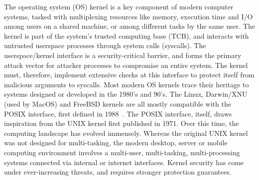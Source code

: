 The operating system (OS) kernel is a key component of modern computer systems,
tasked with multiplexing resources like memory, execution time and I/O among
users on a shared machine, or among different tasks by the same user.
The kernel is part of the system's trusted computing base (TCB), and interacts
with untrusted userspace processes through system calls (syscalls).
The userspace/kernel interface is a security-critical barrier, and forms the
primary attack vector for attacker processes to compromise an entire system.
The kernel must, therefore, implement extensive checks at this interface to
protect itself from malicious arguments to syscalls.
Most modern OS kernels trace their heritage to systems designed or developed in
the 1980's and 90's. 
The Linux, Darwin/XNU (used by MacOS) and FreeBSD kernels are all 
mostly compatible with the POSIX interface, first defined in 
1988~\cite{AtlidakisAGMN16}.
The POSIX interface, itself, draws inspiration from the UNIX kernel first
published in 1971.
Over this time, the computing landscape has evolved immensely.
Whereas the original UNIX kernel was not designed for multi-tasking, the
modern desktop, server or mobile computing environment involves a 
multi-user, multi-tasking, multi-processing systems connected via internal
or internet interfaces.
Kernel security has come under ever-increasing threats, and requires stronger
protection guarantees.
